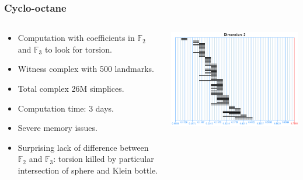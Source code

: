 \documentclass{beamer}
\begin{document}
\begin{frame}
  \frametitle{Cyclo-octane}

  \begin{columns}
    \begin{column}{0.6\textwidth}
      \begin{itemize}
      \item Computation with coefficients in $\mathbb F_2$ and $\mathbb F_3$ to look for torsion.
      \item Witness complex with 500 landmarks.
      \item Total complex 26M simplices.
      \item Computation time: 3 days.
      \item Severe memory issues.
      \item Surprising lack of difference between $\mathbb F_2$ and $\mathbb F_3$: torsion killed by particular intersection of sphere and Klein bottle.
      \end{itemize}
    \end{column}
    \begin{column}{0.3\textwidth}
      \noindent\includegraphics[width=\textwidth]{cyclo8ane2_2} \\

\end{column}
\end{columns}
\end{frame}
\end{document}
